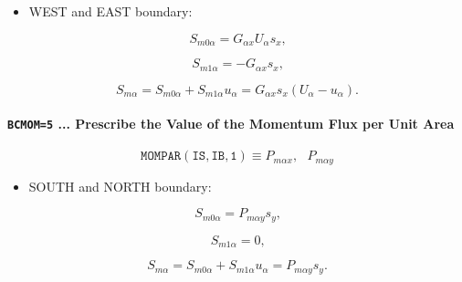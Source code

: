 \documentclass[11pt]{article}
\begin{document}
\bigskip

\begin{itemize}
\item  WEST and EAST boundary:
\end{itemize}

\bigskip

\begin{equation}
S_{m0\alpha}=G_{\alpha x}U_{\alpha}s_{x}\text{,}   \label{c126}
\end{equation}

\begin{equation}
S_{m1\alpha}=-G_{\alpha x}s_{x}\text{,}   \label{c127}
\end{equation}

\begin{equation}
S_{m\alpha}=S_{m0\alpha}+S_{m1\alpha}u_{\alpha}=G_{\alpha x}s_{x}\left(
U_{\alpha}-u_{\alpha}\right) \text{.}   \label{c128}
\end{equation}

\bigskip

\paragraph{\texttt{BCMOM=5} ... Prescribe the Value of the Momentum Flux per
Unit Area}

\bigskip

\begin{equation*}
\mathtt{MOMPAR(IS,IB,1)}\equiv P_{m\alpha x},\text{ }P_{m\alpha y}
\end{equation*}

\bigskip

\begin{itemize}
\item  SOUTH and NORTH boundary:
\end{itemize}

\bigskip

\begin{equation}
S_{m0\alpha}=P_{m\alpha y}s_{y}\text{,}   \label{c129}
\end{equation}

\begin{equation}
S_{m1\alpha}=0\text{,}   \label{c130}
\end{equation}

\begin{equation}
S_{m\alpha}=S_{m0\alpha}+S_{m1\alpha}u_{\alpha}=P_{m\alpha y}s_{y}\text{.} 
\label{c131}
\end{equation}
\end{document}
